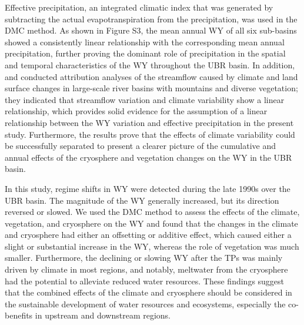 \documentclass[hess, manuscript]{copernicus}
\begin{document}
Effective precipitation, an integrated climatic index that was generated by subtracting the actual evapotranspiration from the precipitation, was used in the DMC method. As shown in Figure S3, the mean annual WY of all six sub-basins showed a consistently linear relationship with the corresponding mean annual precipitation, further proving the dominant role of precipitation in the spatial and temporal characteristics of the WY throughout the UBR basin. In addition, \citet{wei2018} and \citet{zheng2009responses} conducted attribution analyses of the streamflow caused by climate and land surface changes in large-scale river basins with mountains and diverse vegetation; they indicated that streamflow variation and climate variability show a linear relationship, which provides solid evidence for the assumption of a linear relationship between the WY variation and effective precipitation in the present study. Furthermore, the results prove that the effects of climate variability could be successfully separated to present a clearer picture of the cumulative and annual effects of the cryosphere and vegetation changes on the WY in the UBR basin.

\conclusions  %
In this study, regime shifts in WY were detected during the late 1990s over the UBR basin. The magnitude of the WY generally increased, but its direction reversed or slowed. We used the DMC method to assess the effects of the climate, vegetation, and cryosphere on the WY and found that the changes in the climate and cryosphere had either an offsetting or additive effect, which caused either a slight or substantial increase in the WY, whereas the role of vegetation was much smaller. Furthermore, the declining or slowing WY after the TPs was mainly driven by climate in most regions, and notably, meltwater from the cryosphere had the potential to alleviate reduced water resources. These findings suggest that the combined effects of the climate and cryosphere should be considered in the sustainable development of water resources and ecosystems, especially the co-benefits in upstream and downstream regions.


\end{document}
